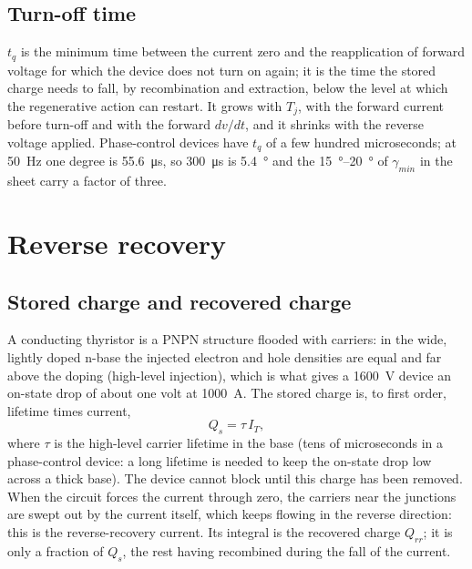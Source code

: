 \documentclass[10pt,a4paper]{scrartcl}
\begin{document}
\subsection{Turn-off time}\label{sec:tq}
$t_q$ is the minimum time between the current zero and the reapplication of forward voltage for which the device does not turn on again; it is the time the stored charge needs to fall, by recombination and extraction, below the level at which the regenerative action can restart. It grows with $T_j$, with the forward current before turn-off and with the forward $dv/dt$, and it shrinks with the reverse voltage applied. Phase-control devices have $t_q$ of a few hundred microseconds; at \SI{50}{Hz} one degree is \SI{55.6}{\micro s}, so \SI{300}{\micro s} is \SI{5.4}{\degree} and the \SIrange{15}{20}{\degree} of $\gamma_{min}$ in the sheet carry a factor of three.

\section{Reverse recovery}\label{sec:rr}
\subsection{Stored charge and recovered charge}
A conducting thyristor is a PNPN structure flooded with carriers: in the wide, lightly doped n-base the injected electron and hole densities are equal and far above the doping (high-level injection), which is what gives a \SI{1600}{V} device an on-state drop of about one volt at \SI{1000}{A}. The stored charge is, to first order, lifetime times current,
\begin{equation}
Q_s = \tau\,I_T ,
\label{eq:Qs}
\end{equation}
where $\tau$ is the high-level carrier lifetime in the base (tens of microseconds in a phase-control device: a long lifetime is needed to keep the on-state drop low across a thick base). The device cannot block until this charge has been removed. When the circuit forces the current through zero, the carriers near the junctions are swept out by the current itself, which keeps flowing in the reverse direction: this is the reverse-recovery current. Its integral is the recovered charge $Q_{rr}$; it is only a fraction of $Q_s$, the rest having recombined during the fall of the current.
\end{document}
